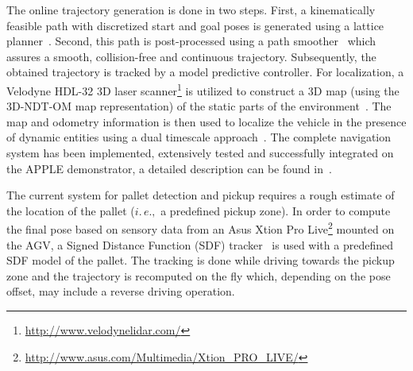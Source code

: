The online trajectory generation is done in two steps. First, a kinematically feasible path with
discretized start and goal poses is generated using a lattice planner~\cite{Ciri14}. Second, this
path is post-processed using a path smoother~\cite{Andr15} which assures a smooth, collision-free
and continuous trajectory. Subsequently, the obtained trajectory is tracked by a model predictive
controller. For localization, a Velodyne HDL-32 3D laser
scanner\footnote{\url{http://www.velodynelidar.com/}} is utilized to construct a 3D map (using the
3D-NDT-OM map representation) of the static parts of the environment~\cite{Stoy13}. The map and
odometry information is then used to localize the vehicle in the presence of dynamic entities using
a dual timescale approach~\cite{Vale14}. The complete navigation system has been implemented,
extensively tested and successfully integrated on the APPLE demonstrator, a detailed description can
be found in~\cite{Andr15}.

The current system for pallet detection and pickup requires a rough estimate of the location of the
pallet ($i.\,e.,$ a predefined pickup zone). In order to compute the final pose based on sensory
data from an Asus Xtion Pro Live\footnote{\url{http://www.asus.com/Multimedia/Xtion_PRO_LIVE/}}
mounted on the AGV, a Signed Distance Function (SDF) tracker~\cite{Cane13} is used with a predefined
SDF model of the pallet. The tracking is done while driving towards the pickup zone and the
trajectory is recomputed on the fly which, depending on the pose offset, may include a reverse
driving operation.
%
